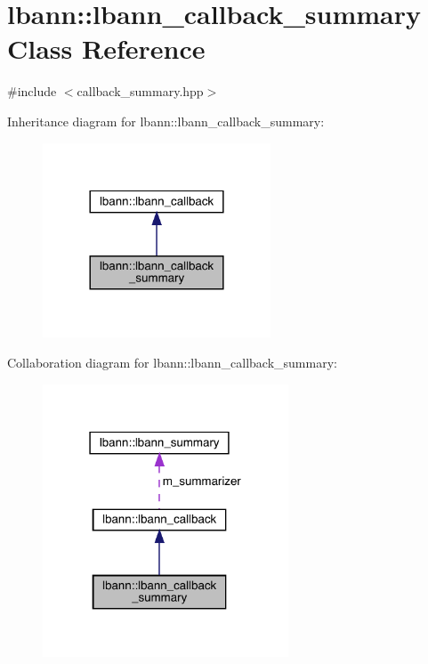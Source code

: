 \hypertarget{classlbann_1_1lbann__callback__summary}{}\section{lbann\+:\+:lbann\+\_\+callback\+\_\+summary Class Reference}
\label{classlbann_1_1lbann__callback__summary}


{\ttfamily \#include $<$callback\+\_\+summary.\+hpp$>$}



Inheritance diagram for lbann\+:\+:lbann\+\_\+callback\+\_\+summary\+:\nopagebreak
\begin{figure}[H]
\begin{center}
\leavevmode
\includegraphics[width=192pt]{classlbann_1_1lbann__callback__summary__inherit__graph}
\end{center}
\end{figure}


Collaboration diagram for lbann\+:\+:lbann\+\_\+callback\+\_\+summary\+:\nopagebreak
\begin{figure}[H]
\begin{center}
\leavevmode
\includegraphics[width=207pt]{classlbann_1_1lbann__callback__summary__coll__graph}
\end{center}
\end{figure}
